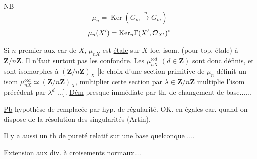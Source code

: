 NB
\[
\mu_n=\operatorname{Ker}(G_m\xrightarrow{n}G_m)
\]
\[
\mu_n(X')=\relax{\operatorname{Ker}}{}_n\Gamma(X',\mathcal O_{X'})^*
\]

Si $n$ premier aux car de $X$, $\mu_{nX}$ est \uline{étale} sur $X$ loc. isom. (pour top. étale) à $\mathbf Z/n\mathbf Z$. Il n'faut surtout pas les confondre. Les $\mu_{nX}^{\otimes d}$ $(d\in\mathbf Z)$ sont donc définis, et sont  isomorphes à $(\mathbf Z/n\mathbf Z)_X$ [le choix d'une section primitive de $\mu_n$ définit un isom $\mu_{nX}^{\otimes d}\simeq(\mathbf Z/n\mathbf Z)_X$, multiplier cette section par $\lambda\in\mathbf Z/n\mathbf Z$ multiplie l'isom précédent par $\lambda^d$ ...]. \uline{Dém} presque immédiate par th. de changement de base......

\uline{Pb}   hypothèse de  remplacée par hyp. de régularité. OK.  en égales car. quand on dispose de la résolution des singularités (Artin).

Il y a aussi un th de pureté relatif sur une base quelconque ....


Extension aux div. à croisements normaux....

